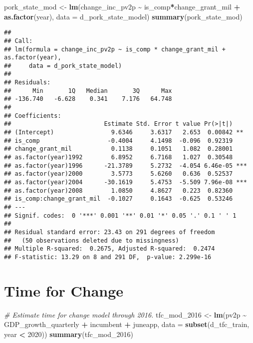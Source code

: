 \documentclass[
]{article}
\newenvironment{Shaded}{\begin{snugshade}}{\end{snugshade}}
\newcommand{\AttributeTok}[1]{\textcolor[rgb]{0.13,0.29,0.53}{#1}}
\newcommand{\CommentTok}[1]{\textcolor[rgb]{0.56,0.35,0.01}{\textit{#1}}}
\newcommand{\DecValTok}[1]{\textcolor[rgb]{0.00,0.00,0.81}{#1}}
\newcommand{\FunctionTok}[1]{\textcolor[rgb]{0.13,0.29,0.53}{\textbf{#1}}}
\newcommand{\NormalTok}[1]{#1}
\newcommand{\OtherTok}[1]{\textcolor[rgb]{0.56,0.35,0.01}{#1}}
\newcommand{\SpecialCharTok}[1]{\textcolor[rgb]{0.81,0.36,0.00}{\textbf{#1}}}
\begin{document}
\begin{Shaded}
\begin{Highlighting}[]
\NormalTok{pork\_state\_mod }\OtherTok{\textless{}{-}} \FunctionTok{lm}\NormalTok{(change\_inc\_pv2p }\SpecialCharTok{\textasciitilde{}}\NormalTok{ is\_comp}\SpecialCharTok{*}\NormalTok{change\_grant\_mil }\SpecialCharTok{+} \FunctionTok{as.factor}\NormalTok{(year),}
                     \AttributeTok{data =}\NormalTok{ d\_pork\_state\_model)}
\FunctionTok{summary}\NormalTok{(pork\_state\_mod)}
\end{Highlighting}
\end{Shaded}

\begin{verbatim}
## 
## Call:
## lm(formula = change_inc_pv2p ~ is_comp * change_grant_mil + as.factor(year), 
##     data = d_pork_state_model)
## 
## Residuals:
##      Min       1Q   Median       3Q      Max 
## -136.740   -6.628    0.341    7.176   64.748 
## 
## Coefficients:
##                          Estimate Std. Error t value Pr(>|t|)    
## (Intercept)                9.6346     3.6317   2.653  0.00842 ** 
## is_comp                   -0.4004     4.1498  -0.096  0.92319    
## change_grant_mil           0.1138     0.1051   1.082  0.28001    
## as.factor(year)1992        6.8952     6.7168   1.027  0.30548    
## as.factor(year)1996      -21.3789     5.2732  -4.054 6.46e-05 ***
## as.factor(year)2000        3.5773     5.6260   0.636  0.52537    
## as.factor(year)2004      -30.1619     5.4753  -5.509 7.96e-08 ***
## as.factor(year)2008        1.0850     4.8627   0.223  0.82360    
## is_comp:change_grant_mil  -0.1027     0.1643  -0.625  0.53246    
## ---
## Signif. codes:  0 '***' 0.001 '**' 0.01 '*' 0.05 '.' 0.1 ' ' 1
## 
## Residual standard error: 23.43 on 291 degrees of freedom
##   (50 observations deleted due to missingness)
## Multiple R-squared:  0.2675, Adjusted R-squared:  0.2474 
## F-statistic: 13.29 on 8 and 291 DF,  p-value: 2.299e-16
\end{verbatim}

\section{Time for Change}\label{time-for-change}

\begin{Shaded}
\begin{Highlighting}[]
\CommentTok{\# Estimate time for change model through 2016.}
\NormalTok{tfc\_mod\_2016 }\OtherTok{\textless{}{-}} \FunctionTok{lm}\NormalTok{(pv2p }\SpecialCharTok{\textasciitilde{}}\NormalTok{ GDP\_growth\_quarterly }\SpecialCharTok{+}\NormalTok{ incumbent }\SpecialCharTok{+}\NormalTok{ juneapp, }
                   \AttributeTok{data =} \FunctionTok{subset}\NormalTok{(d\_tfc\_train, year }\SpecialCharTok{\textless{}} \DecValTok{2020}\NormalTok{))}
\FunctionTok{summary}\NormalTok{(tfc\_mod\_2016)}
\end{Highlighting}
\end{Shaded}
\end{document}
